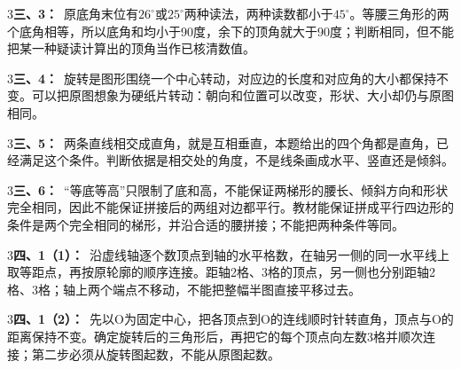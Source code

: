 \documentclass[multi=snippet,border={5bp 20bp 5bp 5bp}]{standalone}
\newenvironment{snippet}[3]{\begin{minipage}{#1bp}\color{answerred}\fontsize{#2}{#3}\selectfont\raggedright}{\end{minipage}}
\begin{document}
\begin{snippet}{505}{11.5}{14}\begin{multicols}{3}\raggedcolumns \textbf{三、3：}\ 原底角末位有\(26^\circ\)\allowbreak 或\(25^\circ\)\allowbreak 两种读法，两种读数都小于\(45^\circ\)\allowbreak 。等腰三角形的两个底角相等，所以底角和均小于90度，余下的顶角就大于90度；判断相同，但不能把某一种疑读计算出的顶角当作已核清数值。\end{multicols}\end{snippet}
\begin{snippet}{505}{11.5}{14}\begin{multicols}{3}\raggedcolumns \textbf{三、4：}\ 旋转是图形围绕一个中心转动，对应边的长度和对应角的大小都保持不变。可以把原图想象为硬纸片转动：朝向和位置可以改变，形状、大小却仍与原图相同。\end{multicols}\end{snippet}
\begin{snippet}{505}{11.5}{14}\begin{multicols}{3}\raggedcolumns \textbf{三、5：}\ 两条直线相交成直角，就是互相垂直，本题给出的四个角都是直角，已经满足这个条件。判断依据是相交处的角度，不是线条画成水平、竖直还是倾斜。\end{multicols}\end{snippet}
\begin{snippet}{505}{11.5}{14}\begin{multicols}{3}\raggedcolumns \textbf{三、6：}\ “等底等高”只限制了底和高，不能保证两梯形的腰长、倾斜方向和形状完全相同，因此不能保证拼接后的两组对边都平行。教材能保证拼成平行四边形的条件是两个完全相同的梯形，并沿合适的腰拼接；不能把两种条件等同。\end{multicols}\end{snippet}
\begin{snippet}{505}{11.5}{14}\begin{multicols}{3}\raggedcolumns \textbf{四、1（1）：}\ 沿虚线轴逐个数顶点到轴的水平格数，在轴另一侧的同一水平线上取等距点，再按原轮廓的顺序连接。距轴2格、3格的顶点，另一侧也分别距轴2格、3格；轴上两个端点不移动，不能把整幅半图直接平移过去。\end{multicols}\end{snippet}
\begin{snippet}{505}{11.5}{14}\begin{multicols}{3}\raggedcolumns \textbf{四、1（2）：}\ 先以O为固定中心，把各顶点到O的连线顺时针转直角，顶点与O的距离保持不变。确定旋转后的三角形后，再把它的每个顶点向左数3格并顺次连接；第二步必须从旋转图起数，不能从原图起数。\end{multicols}\end{snippet}
\end{document}
